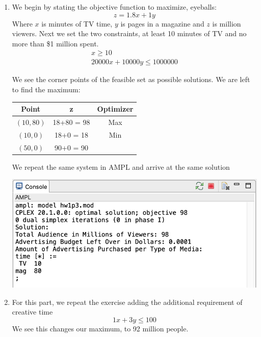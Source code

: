 \documentclass[11pt]{article}
\begin{document}
\begin{enumerate}
\begin{enumerate}
\item We begin by stating the objective function to maximize, eyeballs:
\[
z = 1.8 x + 1y
\]
Where $x$ is minutes of TV time, $y$ is pages in a magazine and $z$ is million viewers.  Next we set the two constraints, at least 10 minutes of TV and no more than \$1 million spent.
\[
\begin{array}{l}
x\geq 10\\
20 000 x + 10 000 y \leq 1 000 000
\end{array}
\]


We see the corner points of the feasible set as possible solutions.  We are left to find the maximum:

\begin{tabular}{c|c|c}
Point& z & Optimizer\\\hline
$(10,80)$& 18+80 = 98&Max\\
$(10,0)$& 18+0 = 18&Min\\
$(50,0)$& 90+0 = 90&
\end{tabular}
We repeat the same system in AMPL and arrive at the same solution

\includegraphics[width = .9\textwidth]{outputp3a.png}
\item For this part, we repeat the exercise adding the additional requirement of creative time
\[
1x+3y\leq 100
\]
We see this changes our maximum, to 92 million people.


\end{enumerate}
\end{enumerate}
\end{document}

